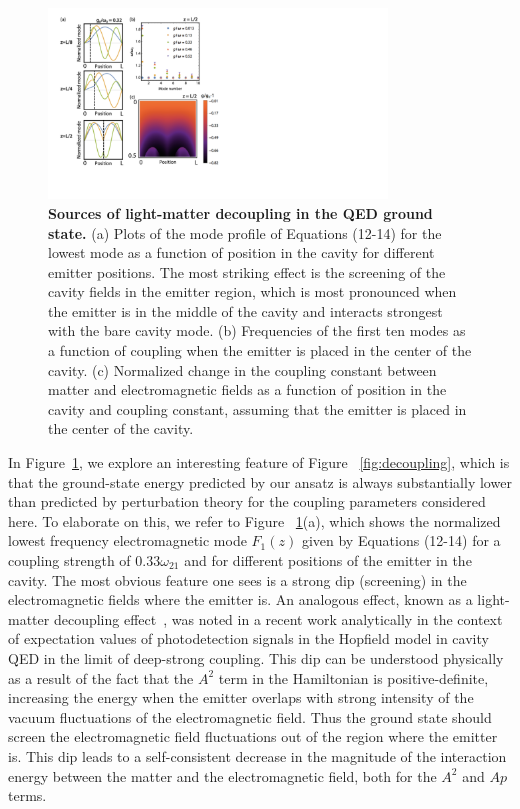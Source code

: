 \documentclass[aps,prb,twocolumn,
	groupedaddress,superscriptaddress,
	amsfonts,amssymb,amsmath,floatfix,
	citeautoscript]{revtex4-1}
\begin{document}
\begin{figure}[t]
\includegraphics[width=9cm]{fig3.pdf}
\caption{\textbf{Sources of light-matter decoupling in the QED ground state.} (a) Plots of the mode profile of Equations (12-14) for the lowest mode as a function of position in the cavity for different emitter positions. The most striking effect is the screening of the cavity fields in the emitter region, which is most pronounced when the emitter is in the middle of the cavity and interacts strongest with the bare cavity mode. (b) Frequencies of the first ten modes as a function of coupling when the emitter is placed in the center of the cavity. (c) Normalized change in the coupling constant between matter and electromagnetic fields as a function of position in the cavity and coupling constant, assuming that the emitter is placed in the center of the cavity.  }
\label{fig:sources_decoupling}
\end{figure}

In Figure~\ref{fig:sources_decoupling}, we explore an interesting feature of Figure ~\ref{fig:decoupling}, which is that the ground-state energy predicted by our ansatz is always substantially lower than predicted by perturbation theory for the coupling parameters considered here. To elaborate on this, we refer to Figure ~\ref{fig:sources_decoupling}(a), which shows the normalized lowest frequency electromagnetic mode $F_1(z)$ given by Equations (12-14) for a coupling strength of $0.33\omega_{21}$ and for different positions of the emitter in the cavity. The most obvious feature one sees is a strong dip (screening) in the electromagnetic fields where the emitter is. An analogous effect, known as a light-matter decoupling effect~\cite{liberato2014,garcia2015light,bayer2017terahertz}, was noted in a recent work analytically in the context of expectation values of photodetection signals in the Hopfield model in cavity QED in the limit of deep-strong coupling. This dip can be understood physically as a result of the fact that the $A^2$ term in the Hamiltonian is positive-definite, increasing the energy when the emitter overlaps with strong intensity of the vacuum fluctuations of the electromagnetic field. Thus the ground state should screen the electromagnetic field fluctuations out of the region where the emitter is. This dip leads to a self-consistent decrease in the magnitude of the interaction energy between the matter and the electromagnetic field, both for the $A^2$ and $Ap$ terms. 
\end{document}
